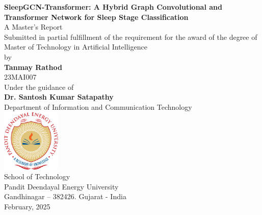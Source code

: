 \begin{center}
    {{\Large \textbf{SleepGCN-Transformer: A Hybrid Graph Convolutional and
Transformer Network for Sleep Stage Classification
}}}\\
    \vspace{0.6cm}
    {\large A Master's Report}\\
    {\large Submitted in partial fulfillment of the requirement for the award of the degree of}\\
    \vspace{0.8cm}
    {\large Master of Technology in Artificial Intelligence}\\
    {\large by}\\
    \textbf{{\Large  Tanmay Rathod}}\\
    {\large 23MAI007}\\
    \vspace{0.7cm}
    {\large Under the guidance of}\\
    {\large  \textbf{Dr. Santosh Kumar Satapathy}  {\large }}\\
    {\large Department of Information and Communication Technology}\\
    \vspace{0.6cm}
        \vfill
    {\centering \includegraphics[width=0.21\textwidth]{img/pdpu_logo.png}}\\
    {\large School of Technology}\\
    {\large Pandit Deendayal Energy University}\\
    {\large Gandhinagar – 382426. Gujarat - India}\\
    {\large February, 2025}
\end{center}